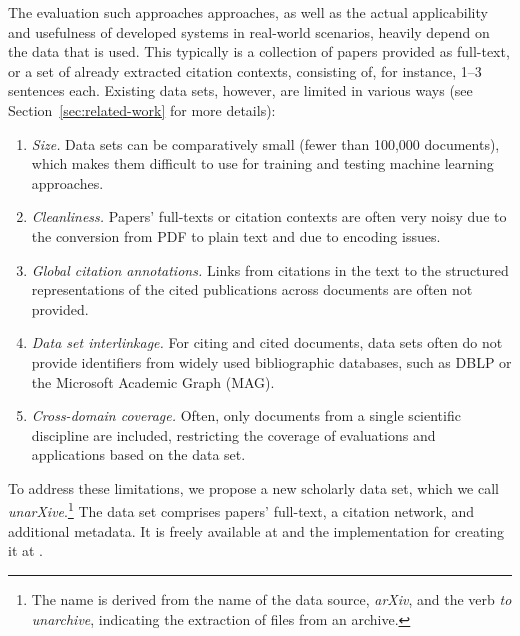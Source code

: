 The evaluation such approaches approaches, as well as the actual applicability and usefulness of developed systems in real-world scenarios, heavily depend on the data that is used. This typically is a collection of papers provided as full-text, or a set of already extracted citation contexts, consisting of, for instance, 1--3 sentences each. Existing data sets, however, are limited in various ways (see Section~\ref{sec:related-work} for more details):

\begin{enumerate}
 \item[(1)] \textit{Size.} Data sets can be comparatively small (fewer than 100,000 documents), which makes them difficult to use for training and testing machine learning approaches.
 \item[(2)] \textit{Cleanliness.} Papers' full-texts or citation contexts are often very noisy due to the conversion from PDF to plain text and due to encoding issues.
 \item[(3)] \textit{Global citation annotations.} Links from citations in the text to the structured representations of the cited publications across documents are often not provided.
 \item[(4)] \textit{Data set interlinkage.} For citing and cited documents, data sets often do not provide identifiers from widely used bibliographic databases, such as DBLP or the Microsoft Academic Graph (MAG).
 \item[(5)] \textit{Cross-domain coverage.} Often, only documents from a single scientific discipline are included, restricting the coverage of evaluations and applications based on the data set.
\end{enumerate}

To address these limitations, we propose a new scholarly data set, which we call \emph{unarXive}.\footnote{The name is derived from the name of the data source, \textit{arXiv}, and the verb \textit{to unarchive}, indicating the extraction of files from an archive.} The data set comprises papers' full-text, a citation network, and additional metadata.
It is freely available at  and the implementation for creating it at .

